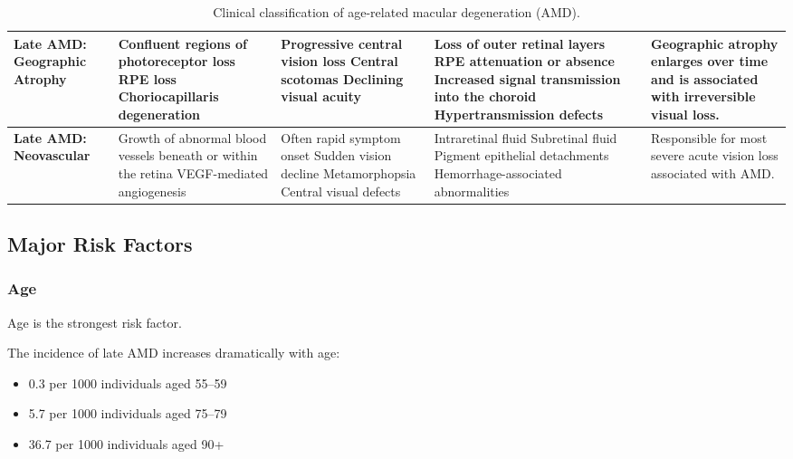 \documentclass[11pt]{article}
\begin{document}
\begin{table}[H]
\begin{tabularx}{\textwidth}{>{\raggedright\arraybackslash}p{2.4cm}
>{\raggedright\arraybackslash}p{3.0cm}
>{\raggedright\arraybackslash}p{3.0cm}
>{\raggedright\arraybackslash}p{3.2cm}
>{\raggedright\arraybackslash}X}
\textbf{Late AMD: Geographic Atrophy}
&
Confluent regions of photoreceptor loss\newline
RPE loss\newline
Choriocapillaris degeneration
&
Progressive central vision loss\newline
Central scotomas\newline
Declining visual acuity
&
Loss of outer retinal layers\newline
RPE attenuation or absence\newline
Increased signal transmission into the choroid\newline
Hypertransmission defects
&
Geographic atrophy enlarges over time and is associated with irreversible visual loss.
\\
\midrule

\textbf{Late AMD: Neovascular}
&
Growth of abnormal blood vessels beneath or within the retina\newline
VEGF-mediated angiogenesis
&
Often rapid symptom onset\newline
Sudden vision decline\newline
Metamorphopsia\newline
Central visual defects
&
Intraretinal fluid\newline
Subretinal fluid\newline
Pigment epithelial detachments\newline
Hemorrhage-associated abnormalities
&
Responsible for most severe acute vision loss associated with AMD.
\\

\bottomrule
\end{tabularx}

\caption{Clinical classification of age-related macular degeneration (AMD).}
\label{tab:amd_classification}
\end{table}

\subsection*{Major Risk Factors}

\subsubsection*{Age}

Age is the strongest risk factor.

The incidence of late AMD increases dramatically with age:

\begin{itemize}
    \item 0.3 per 1000 individuals aged 55--59
    \item 5.7 per 1000 individuals aged 75--79
    \item 36.7 per 1000 individuals aged 90+
\end{itemize}
\end{document}
